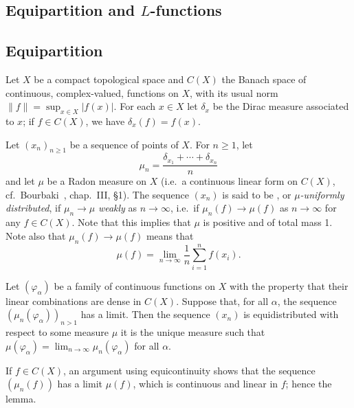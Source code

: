\begin{subappendices}
\section{Equipartition and \texorpdfstring{$L$}{L}-functions}
\label{sec:I_A}

\subsection{Equipartition}
Let $X$ be a compact topological space and $C(X)$ the Banach
space of continuous, complex-valued, functions on $X$, with its usual norm
$\|f\| = \sup_{x \in X} |f(x)|$. For each $x \in X$ let $\delta_x$ be the Dirac
measure associated to $x$; if $f \in C(X)$, we have $\delta_x(f) = f(x)$.

Let $(x_n)_{n\ge 1}$ be a sequence of points of $X$. For $n \ge 1$, let
\[
	\mu_n = \frac{ \delta_{x_1} + \cdots + \delta_{x_n} }{n}
\]
and
\dpage
let $\mu$ be a Radon measure on $X$ (i.e.\ a continuous linear form on $C(X)$,
cf.\ Bourbaki~\cite{bourbaki:int}, chap.~III, \S 1).
%
The sequence $(x_n)$ is said to be
,
or \emph{$\mu$-uniformly distributed}, if $\mu_n \to \mu$ \emph{weakly} as $n
\to \infty$, i.e.\ if $\mu_n(f) \to \mu(f)$ as $n \to \infty$ for any $f \in
C(X)$. Note that this implies that $\mu$ is positive and of total mass 1.  Note
also that $\mu_n(f) \to \mu(f)$ means that
\[
	\mu(f) = \lim_{n\to\infty} \frac{1}{n} \sum_{i=1}^{n} f(x_i).
\]

\begin{lem}\label{lem:IA_1}
Let $(\varphi_\alpha)$ be a family of continuous functions on $X$ with the
property that their linear combinations are dense in $C(X)$. Suppose that, for
all $\alpha$, the sequence $( \mu_n(\varphi_\alpha) )_{n>1}$ has a limit.  Then
the sequence $(x_n)$ is equidistributed with respect to some measure $\mu$ it
is the unique measure such that $\mu(\varphi_\alpha) = \lim_{n\to\infty}
\mu_n(\varphi_\alpha)$ for all $\alpha$.
\end{lem}

If $f \in C(X)$, an argument using equicontinuity shows that the sequence
$(\mu_n(f))$ has a limit $\mu(f)$, which is continuous and linear in $f$; hence
the lemma.


\end{subappendices}
